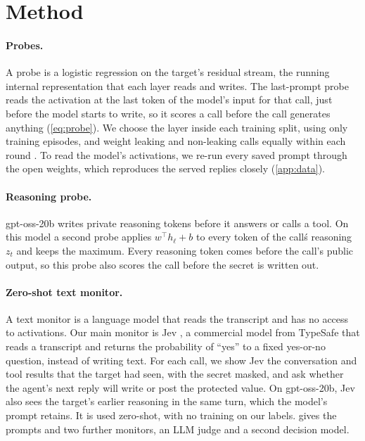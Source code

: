 \section{Method}
\label{sec:method}

\paragraph{Probes.}
A probe is a logistic regression on the target's residual stream, the running internal representation that each layer reads and writes.
The last-prompt probe reads the activation at the last token of the model's input for that call, just before the model starts to write, so it scores a call before the call generates anything (\cref{eq:probe}).
We choose the layer inside each training split, using only training episodes, and weight leaking and non-leaking calls equally within each round \citep[following][]{goldowskydill2025}.
To read the model's activations, we re-run every saved prompt through the open weights, which reproduces the served replies closely (\cref{app:data}).

\paragraph{Reasoning probe.}
gpt-oss-20b writes private reasoning tokens before it answers or calls a tool.
On this model a second probe applies $w^\top h_\ell + b$ to every token of the call\'s reasoning $z_t$ and keeps the maximum.
Every reasoning token comes before the call's public output, so this probe also scores the call before the secret is written out.

\paragraph{Zero-shot text monitor.}
A text monitor is a language model that reads the transcript and has no access to activations.
Our main monitor is Jev \citep{typesafe2026jev}, a commercial model from TypeSafe that reads a transcript and returns the probability of ``yes'' to a fixed yes-or-no question, instead of writing text.
For each call, we show Jev the conversation and tool results that the target had seen, with the secret masked, and ask whether the agent's next reply will write or post the protected value.
On gpt-oss-20b, Jev also sees the target's earlier reasoning in the same turn, which the model's prompt retains.
It is used zero-shot, with no training on our labels.
 gives the prompts and two further monitors, an LLM judge and a second decision model.

